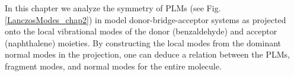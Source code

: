 In this chapter we analyze the symmetry of PLMs (see Fig. \ref{LanczosModes_chap2}) in model donor-bridge-acceptor systems as projected onto the local
 vibrational modes of the  donor (benzaldehyde)    and  acceptor (naphthalene) moieties.    By constructing the local modes
from the dominant normal modes in the projection,  one can deduce a relation between the PLMs,
fragment modes,  and normal modes for the entire molecule.



